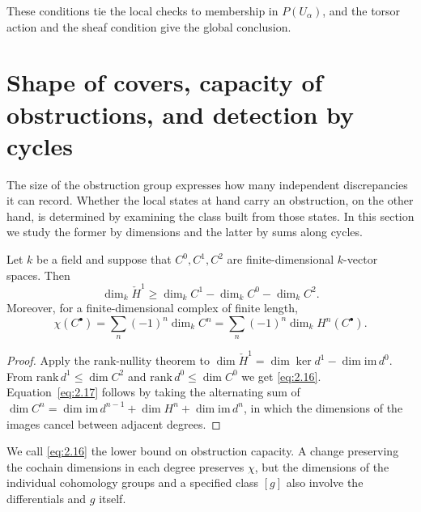 These conditions tie the local checks to membership in $P(U_\alpha)$, and the torsor
action and the sheaf condition give the global conclusion.

\section{Shape of covers, capacity of obstructions, and detection by cycles}\label{sec:2.6}

The size of the obstruction group expresses how many independent discrepancies it can
record. Whether the local states at hand carry an obstruction, on the other hand, is
determined by examining the class built from those states. In this section we study the
former by dimensions and the latter by sums along cycles.

\begin{proposition}\label{prop:2.24}

Let $k$ be a field and suppose that $C^0,C^1,C^2$ are finite-dimensional $k$-vector
spaces. Then
\begin{equation*}
\dim_k\check H^1
\geq\dim_k C^1-\dim_k C^0-\dim_k C^2.
\tag{2.16}\label{eq:2.16}
\end{equation*}
Moreover, for a finite-dimensional complex of finite length,
\begin{equation*}
\chi(C^\bullet)
=\sum_n(-1)^n\dim_k C^n
=\sum_n(-1)^n\dim_k H^n(C^\bullet).
\tag{2.17}\label{eq:2.17}
\end{equation*}

\end{proposition}

\begin{proof}

Apply the rank-nullity theorem to
$\dim\check H^1=\dim\ker d^1-\dim\mathrm{im}\,d^0$. From
$\mathrm{rank}\,d^1\leq\dim C^2$ and $\mathrm{rank}\,d^0\leq\dim C^0$ we get
\eqref{eq:2.16}. Equation~\eqref{eq:2.17} follows by taking the alternating sum of
$\dim C^n=\dim\mathrm{im}\,d^{n-1}+\dim H^n+\dim\mathrm{im}\,d^n$, in which the dimensions
of the images cancel between adjacent degrees.

\end{proof}

We call \eqref{eq:2.16} the lower bound on obstruction capacity. A change preserving the
cochain dimensions in each degree preserves $\chi$, but the dimensions of the individual
cohomology groups and a specified class $[g]$ also involve the differentials and $g$
itself.

